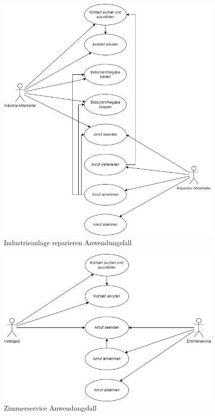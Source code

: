 \begin{figure}[ht!]
    \includegraphics[width=\paperwidth-2in]{../assets/img/UML-Anwendungsfalldiagramme-Industrieanlage reparieren.drawio}
    \caption{Industrieanlage reparieren Anwendungsfall}
    \label{fig:industrieanlage-reparieren}
\end{figure}

\begin{figure}[ht!]
    \includegraphics[width=\paperwidth-2in]{../assets/img/UML-Anwendungsfalldiagramme-Zimmerservice.drawio}
    \caption{Zimmerservice Anwendungsfall}
    \label{fig:zimmerservice}
\end{figure}


